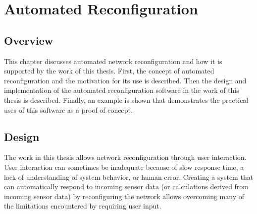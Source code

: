 
\chapter{Automated Reconfiguration}
\label{Chapter 6}

\section{Overview}
This chapter discusses automated network reconfiguration and how it is supported by the work of this thesis. First, the concept of automated reconfiguration and the motivation for its use is described. Then the design and implementation of the automated reconfiguration software in the work of this thesis is described. Finally, an example is shown that demonstrates the practical uses of this software as a proof of concept.


\section{Design}
The work in this thesis allows network reconfiguration through user interaction. User interaction can sometimes be inadequate because of slow response time, a lack of understanding of system behavior, or human error. Creating a system that can automatically respond to incoming sensor data (or calculations derived from incoming sensor data) by reconfiguring the network allows overcoming many of the limitations encountered by requiring user input. \\


